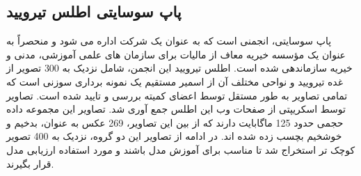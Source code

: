 \subsection{پاپ سوسایتی اطلس تیرویید}\label{subsec:پاپ-سوسایتی}
پاپ سوسایتی، انجمنی است که به عنوان یک شرکت اداره می شود و منحصراً به عنوان یک مؤسسه خیریه معاف از مالیات برای سازمان های علمی آموزشی، مدنی و خیریه سازماندهی شده است.
اطلس تیرویید این انجمن\cite{papsocietyiamgeatlas}، شامل نزدیک به 300 تصویر از غده تیرویید و نواحی مختلف آن از اسمیر مستقیم یک نمونه برداری سوزنی است که تمامی تصاویر به طور مستقل توسط اعضای کمیته بررسی و تایید شده است.
تصاویر توسط اسکریپتی از صفحات وب این اطلس جمع آوری شد. تصاویر این مجموعه داده حجمی حدود 125 ماگابایت دارند که از بین این تصاویر، 269 عکس به عنوان، بدخیم و خوشخیم بچسب زده شده اند. در ادامه از تصاویر این دو گروه، نزدیک به 400 تصویر کوچک تر استخراج شد تا مناسب برای آموزش مدل باشند و مورد استفاده ارزیابی مدل قرار بگیرند. 